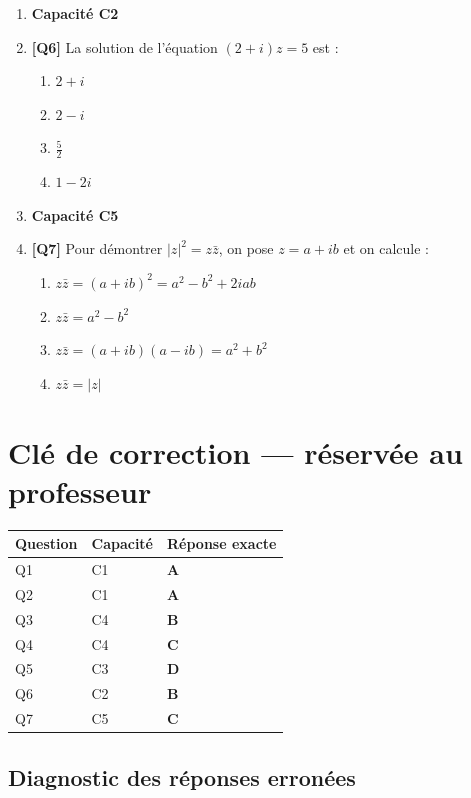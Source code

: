 \begin{enumerate}
\item[] \textbf{Capacité C2}

\item \textbf{[Q6]} La solution de l'équation $(2+i)z=5$ est :
  \begin{enumerate}[label=\Alph*.]
    \item $2+i$
    \item $2-i$
    \item $\tfrac52$
    \item $1-2i$
  \end{enumerate}

\item[] \textbf{Capacité C5}

\item \textbf{[Q7]} Pour démontrer $|z|^2=z\bar z$, on pose $z=a+ib$ et on calcule :
  \begin{enumerate}[label=\Alph*.]
    \item $z\bar z=(a+ib)^2=a^2-b^2+2iab$
    \item $z\bar z=a^2-b^2$
    \item $z\bar z=(a+ib)(a-ib)=a^2+b^2$
    \item $z\bar z=|z|$
  \end{enumerate}

\end{enumerate}

\ifnxVersionProfesseur
\clearpage
\section*{Clé de correction — réservée au professeur}

\begin{center}
\begin{tabular}{lll}
\hline
Question & Capacité & Réponse exacte \\
\hline
Q1 & C1 & \textbf{A} \\
Q2 & C1 & \textbf{A} \\
Q3 & C4 & \textbf{B} \\
Q4 & C4 & \textbf{C} \\
Q5 & C3 & \textbf{D} \\
Q6 & C2 & \textbf{B} \\
Q7 & C5 & \textbf{C} \\
\hline
\end{tabular}
\end{center}

\subsection*{Diagnostic des réponses erronées}

